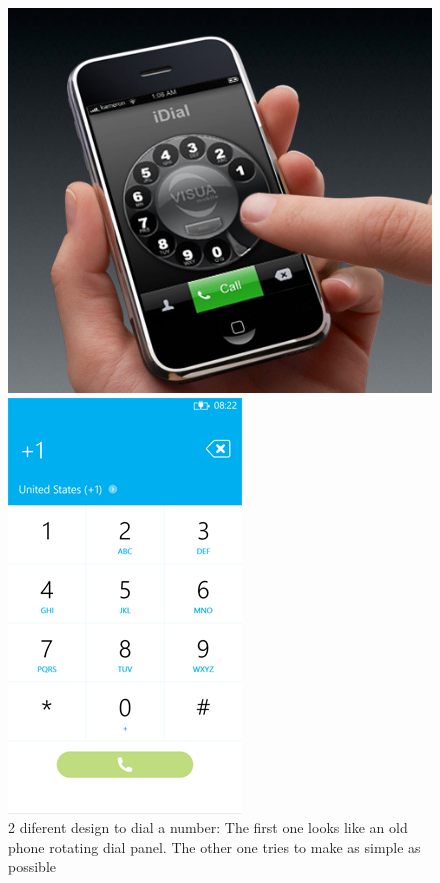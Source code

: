 \documentclass[a4paper,11pt] {article}
\theoremstyle{definition}
\begin{document}
    \begin{figure}
   \begin{minipage}[c]{.46\linewidth}
      \centering
      \includegraphics[scale=0.4]{fig-report/idial.jpg}

   \end{minipage} \hfill
   \begin{minipage}[c]{.46\linewidth}
   \centering
         \includegraphics[scale=0.5	]{fig-report/dial-flat.png}
   \end{minipage}
   \caption{2 diferent design to dial a number: The first one looks like an old phone rotating dial panel. The other one tries to make as simple as possible}
\end{figure}
\end{document}
